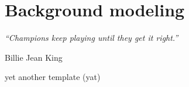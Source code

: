 \chapter{Background modeling}
\label{ch:bkg_modeling}
\epigraph{\emph{“Champions keep playing until they get it right.”}}{Billie Jean King}

yet another template (yat)